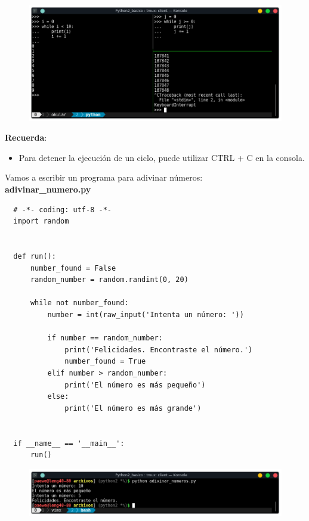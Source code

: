 \documentclass{article}
\begin{document}
\begin{figure}[h!]
  \centering
  \includegraphics[scale=0.75]{./Pictures/030_while_loop.png}
\end{figure}

\textbf{Recuerda}:
\begin{itemize}
  \item Para detener la ejecución de un ciclo, puede utilizar CTRL + C en la
    consola.
\end{itemize}

Vamos a escribir un programa para adivinar números:\\

\textbf{adivinar\_numero.py}
\begin{verbatim}
  # -*- coding: utf-8 -*-
  import random


  def run():
      number_found = False
      random_number = random.randint(0, 20)

      while not number_found:
          number = int(raw_input('Intenta un número: '))

          if number == random_number:
              print('Felicidades. Encontraste el número.')
              number_found = True
          elif number > random_number:
              print('El número es más pequeño')
          else:
              print('El número es más grande')


  if __name__ == '__main__':
      run()
\end{verbatim}

\begin{figure}[h!]
  \centering
  \includegraphics[scale=0.75]{./Pictures/031_adivinar_numero.png}
\end{figure}
\end{document}
